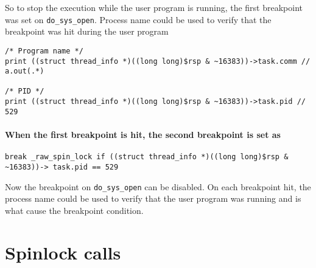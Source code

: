 \documentclass[10pt] {article}
\begin{document}
\noindent So to stop the execution while the user program is running, the first breakpoint was set on \texttt{do\_sys\_open}. Process name could be used to verify that the breakpoint was hit during the user program\\
\begin{verbatim}
/* Program name */
print ((struct thread_info *)((long long)$rsp & ~16383))->task.comm // a.out(.*) 

/* PID */
print ((struct thread_info *)((long long)$rsp & ~16383))->task.pid // 529
\end{verbatim}

\paragraph{When the first breakpoint is hit, the second breakpoint is set as }
\begin{verbatim}
break _raw_spin_lock if ((struct thread_info *)((long long)$rsp & ~16383))-> task.pid == 529
\end{verbatim}

\noindent Now the breakpoint on \texttt{do\_sys\_open} can be disabled. On each breakpoint hit, the process name could be used to verify that the user program was running and is what cause the breakpoint condition.


\section{Spinlock calls }

\end{document}
